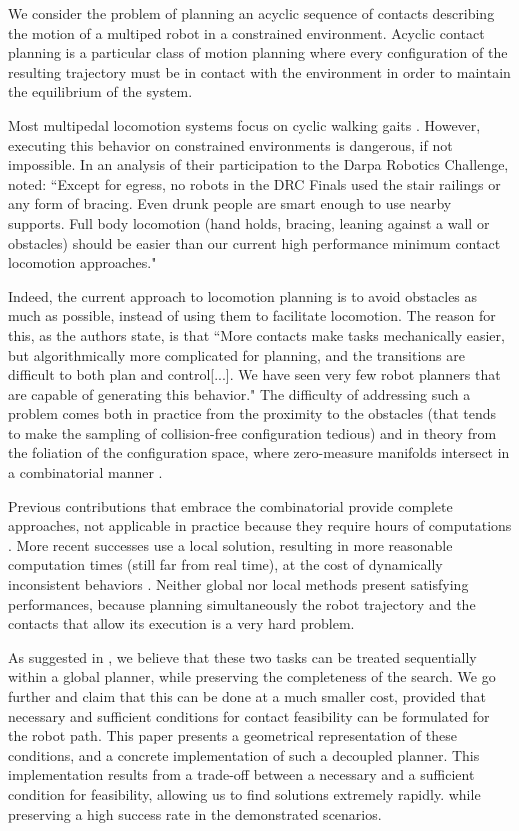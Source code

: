 We consider the problem of planning an acyclic sequence of contacts describing the motion of a multiped robot in a constrained environment. Acyclic contact planning is a particular class of motion planning where every configuration of the resulting trajectory must be in contact with the environment in order to maintain the equilibrium of the system.

Most multipedal locomotion systems focus on cyclic walking gaits \citep{Kajita03a}. However, executing
this behavior on constrained environments is dangerous, if not impossible.
In an analysis of their participation to the Darpa Robotics Challenge, \citeauthor{atkensondarpa}
noted: ``Except for egress, no robots in the DRC Finals used
the  stair  railings  or  any  form  of  bracing.   Even  drunk  people  are  smart  enough  to  use  nearby  supports.
Full body locomotion (hand holds,  bracing,  leaning against a wall or obstacles) should be easier than our
current high performance minimum contact locomotion approaches."

Indeed, the current approach to locomotion planning is to avoid obstacles as much as possible, instead of using them
to facilitate locomotion. The reason for this, as the authors state, is that ``More contacts make tasks
mechanically easier, but algorithmically more complicated for planning, and the transitions are difficult to
both plan and control[...].  We have seen very few robot planners that are  capable of  generating this  behavior."
The difficulty of addressing such a problem comes both in practice from the proximity to the obstacles (that tends to make the sampling of collision-free configuration tedious) and in theory from the foliation of the configuration space, where zero-measure manifolds intersect in a combinatorial manner \citep{simeon-manipulation-04}.

Previous contributions that embrace the combinatorial provide complete approaches, not applicable in practice because they require hours of computations \citep{Bretl:2006:MPM:1124573.1124585}.
More recent successes use a local solution, resulting in more reasonable computation times (still far from real time), at the cost of dynamically inconsistent behaviors \citep{Mordatch:2012:DCB:2185520.2185539}.
Neither global nor local methods present satisfying performances, because planning simultaneously the robot trajectory and the contacts that allow
its execution is a very hard problem. 

As suggested in \cite{Bouyarmane2009}, we believe that these two tasks can be treated sequentially within a global planner, while preserving the completeness of the search.
We go further and claim that this can be done at a much smaller cost, provided that necessary and sufficient conditions for contact feasibility can be formulated for the robot path.
This paper presents a geometrical representation of these conditions, and a concrete implementation of such a decoupled planner.
This implementation results from a trade-off between a necessary and a sufficient condition for feasibility, allowing us to find solutions extremely rapidly.
while preserving a high success rate in the demonstrated scenarios.

